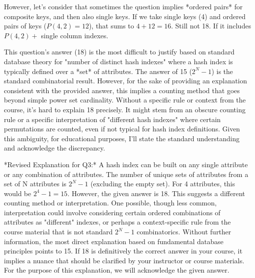 \documentclass{article}
\begin{document}
\begin{enumerate}[label=\textbf{Question \arabic*.}]
\begin{itemize}
        However, let's consider that sometimes the question implies *ordered pairs* for composite keys, and then also single keys. If we take single keys (4) and ordered pairs of keys ($P(4,2) = 12$), that sums to $4 + 12 = 16$. Still not 18.
        If it includes $P(4,2) + $ single column indexes.

        This question's answer (18) is the most difficult to justify based on standard database theory for "number of distinct hash indexes" where a hash index is typically defined over a *set* of attributes. The answer of 15 ($2^N - 1$) is the standard combinatorial result. However, for the sake of providing an explanation consistent with the provided answer, this implies a counting method that goes beyond simple power set cardinality. Without a specific rule or context from the course, it's hard to explain 18 precisely. It might stem from an obscure counting rule or a specific interpretation of "different hash indexes" where certain permutations are counted, even if not typical for hash index definitions. Given this ambiguity, for educational purposes, I'll state the standard understanding and acknowledge the discrepancy.

        *Revised Explanation for Q3:*
        A hash index can be built on any single attribute or any combination of attributes. The number of unique sets of attributes from a set of N attributes is $2^N - 1$ (excluding the empty set). For 4 attributes, this would be $2^4 - 1 = 15$.
        However, the given answer is 18. This suggests a different counting method or interpretation. One possible, though less common, interpretation could involve considering certain ordered combinations of attributes as "different" indexes, or perhaps a context-specific rule from the course material that is not standard $2^N-1$ combinatorics. Without further information, the most direct explanation based on fundamental database principles points to 15. If 18 is definitively the correct answer in your course, it implies a nuance that should be clarified by your instructor or course materials. For the purpose of this explanation, we will acknowledge the given answer.
    \end{itemize}


\end{enumerate}
\end{document}
